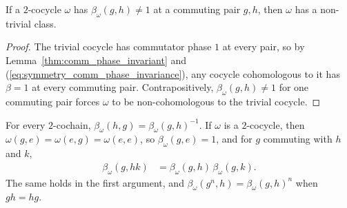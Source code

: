 \begin{lemma}\label{thm:nontrivial_of_comm_phase}
    \leanok
    If a $2$-cocycle $\omega$ has $\beta_\omega(g,h)\neq 1$ at a commuting
    pair $g,h$, then $\omega$ has a non-trivial class.
\end{lemma}

\begin{proof}\leanok{}
    The trivial cocycle has commutator phase $1$ at every pair, so by
    Lemma~\ref{thm:comm_phase_invariant} and
    (\ref{eq:symmetry_comm_phase_invariance}), any cocycle cohomologous to it
    has $\beta=1$ at every commuting pair. Contrapositively,
    $\beta_\omega(g,h)\neq 1$ for one commuting pair forces $\omega$ to be
    non-cohomologous to the trivial cocycle.
\end{proof}

\begin{lemma}
    \label{thm:comm_phase_bicharacter}
    \leanok
    For every $2$-cochain, $\beta_\omega(h,g)=\beta_\omega(g,h)^{-1}$. If
    $\omega$ is a $2$-cocycle, then $\omega(g,e)=\omega(e,g)=\omega(e,e)$, so
    $\beta_\omega(g,e)=1$, and for $g$ commuting with $h$ and $k$,
    \begin{align}
        \beta_\omega(g,hk) & =\beta_\omega(g,h)\,\beta_\omega(g,k).
        \label{eq:symmetry_comm_phase_bicharacter}
    \end{align}
    The same holds in the first argument, and
    $\beta_\omega(g^n,h)=\beta_\omega(g,h)^n$ when $gh=hg$.
\end{lemma}

